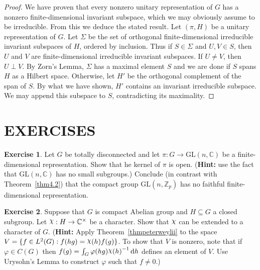 \documentclass[12pt,reqno]{book}%
\theoremstyle{definition}
\newtheorem{exercise}{Exercise}[chapter]
\theoremstyle{remark}
\theoremstyle{theorem}
\theoremstyle{remark}
\newcommand{\mychi}{\raisebox{2pt}{$\chi$}}
\renewcommand{\d}{\dd}
\begin{document}
\begin{proof}
    We have proven that every nonzero unitary representation of $G$ has a nonzero finite-dimensional invariant subspace, which we may obviously assume to be irreducible.
    From this we deduce the stated result.
    Let $(\pi, H)$ be a unitary representation of $G$.
    Let $\Sigma$ be the set of orthogonal finite-dimensional irreducible invariant subspaces of $H$, ordered by inclusion.
    Thus if $S \in \Sigma$ and $U, V \in S$, then $U$ and $V$ are finite-dimensional irreducible invariant subspaces.
    If $U \neq V$, then $U \perp V$.
    By Zorn's Lemma, $\Sigma$ has a maximal element $S$ and we are done if $S$ spans $H$ as a Hilbert space.
    Otherwise, let $H'$ be the orthogonal complement of the span of $S$.
    By what we have shown, $H'$ contains an invariant irreducible subspace.
    We may append this subspace to $S$, contradicting its maximality.
\end{proof}%

\section*{EXERCISES}%
\begin{exercise}\label{}
    Let $G$ be totally disconnected and let $\pi : G \to \mathrm{GL}(n, \mathbb{C})$ be a finite-dimensional representation.
    Show that he kernel of $\pi$ is open.
    (\textbf{Hint:} use the fact that $\mathrm{GL}(n, \mathbb{C})$ has no small subgroups.)
    Conclude (in contrast with Theorem~\ref{thm4.2}) that the compact group $\mathrm{GL}(n, \mathbb{Z}_p)$ has no faithful finite-dimensional representation.
\end{exercise}

\begin{exercise}\label{}
    Suppose that $G$ is compact Abelian group and $H \subseteq G$ a closed subgroup.
    Let $\mychi : H \to \mathbb{C}^{\times}$ be a character.
    Show that $\mychi$ can be extended to a character of $G$.
    (\textbf{Hint:} Apply Theorem~\ref{thmpeterweylii} to the space $V = \{f \in L^2(G) : f(hg) = \mychi(h) f(g)\}$.
    To show that $V$ is nonzero, note that if $\varphi \in C(G)$ then $f(g) = \int_{G} \varphi(hg) {\mychi(h)}^{-1} \, \d h$ defines an element of $V$.
    Use Urysohn's Lemma to construct $\varphi$ such that $f \neq 0$.)
\end{exercise}



\end{document}
